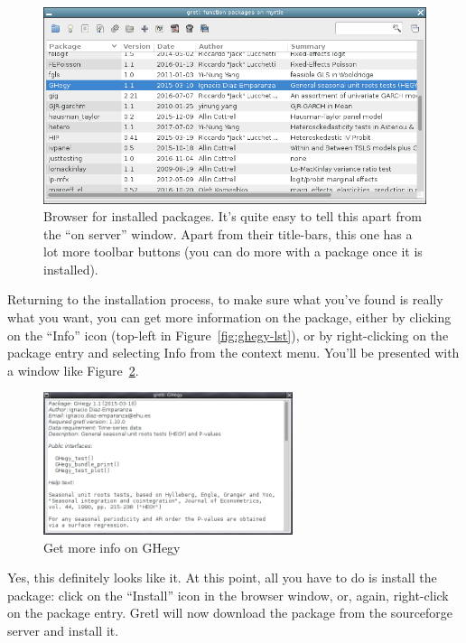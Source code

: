 \documentclass[oneside]{book}
\begin{document}
\begin{figure}[htbp]
\begin{center}
  \includegraphics[scale=0.5]{figures/local-packages.png}
\end{center}
\caption{Browser for installed packages. It's quite easy to tell this
  apart from the ``on server'' window. Apart from their title-bars,
  this one has a lot more toolbar buttons (you can do more with a
  package once it is installed).}
\label{fig:local-packages}
\end{figure}

Returning to the installation process, to make sure what you've found
is really what you want, you can get more information on the package,
either by clicking on the ``Info'' icon (top-left in
Figure~\ref{fig:ghegy-lst}), or by right-clicking on the package entry
and selecting \textsf{Info} from the context menu. You'll be presented
with a window like Figure~\ref{fig:ghegy-info}.

\begin{figure}[htbp]
\begin{center}
  \includegraphics[width=0.65\textwidth]{figures/ghegy-info.png}
\end{center}
\caption{Get more info on GHegy}
\label{fig:ghegy-info}
\end{figure}

Yes, this definitely looks like it. At this point, all you have to do
is install the package: click on the ``Install'' icon in the browser
window, or, again, right-click on the package entry. Gretl will now
download the package from the sourceforge server and install it.
\end{document}
